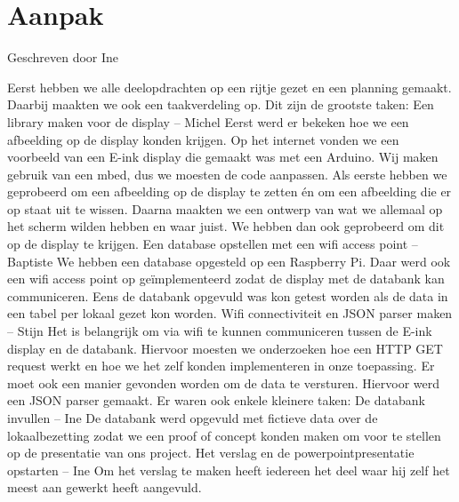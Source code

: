 \documentclass[a4paper,kul]{kulakarticle} %
\begin{document}
\section{Aanpak}
{\scriptsize Geschreven door Ine}
\newline

Eerst hebben we alle deelopdrachten op een rijtje gezet en een planning gemaakt. Daarbij maakten we ook een taakverdeling op. 
\newline
\newline
Dit zijn de grootste taken:
\newline
\newline
Een library maken voor de display – Michel
\newline
Eerst werd er bekeken hoe we een afbeelding op de display konden krijgen. Op het internet vonden we een voorbeeld van een E-ink display die gemaakt was met een Arduino. Wij maken gebruik van een mbed, dus we moesten de code aanpassen. 
Als eerste hebben we geprobeerd om een afbeelding op de display te zetten én om een afbeelding die er op staat uit te wissen.
Daarna maakten we een ontwerp van wat we allemaal op het scherm wilden hebben en waar juist. We hebben dan ook geprobeerd om dit op de display te krijgen.
\newline
\newline
Een database opstellen met een wifi access point – Baptiste
\newline
We hebben een database opgesteld op een Raspberry Pi. Daar werd ook een wifi access point op geïmplementeerd zodat de display met de databank kan communiceren.
Eens de databank opgevuld was kon getest worden als de data in een tabel per lokaal gezet kon worden.
\newline
\newline
Wifi connectiviteit en JSON parser maken – Stijn
\newline
Het is belangrijk om via wifi te kunnen communiceren tussen de E-ink display en de databank. Hiervoor moesten we onderzoeken hoe een HTTP GET request werkt en hoe we het zelf konden implementeren in onze toepassing.
\newline
Er moet ook een manier gevonden worden om de data te versturen. Hiervoor werd een JSON parser gemaakt.
\newline
\newline
Er waren ook enkele kleinere taken:
\newline
\newline
De databank invullen – Ine
\newline
De databank werd opgevuld met fictieve data over de lokaalbezetting zodat we een proof of concept konden maken om voor te stellen op de presentatie van ons project.
\newline
\newline
Het verslag en de powerpointpresentatie opstarten – Ine 
\newline
Om het verslag te maken heeft iedereen het deel waar hij zelf het meest aan gewerkt heeft aangevuld. 
\newline
\end{document}
